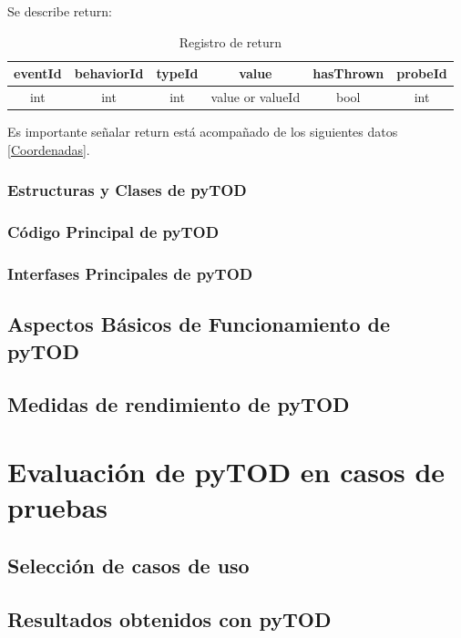 \documentclass[12pt,legalpaper]{report}
\begin{document}
Se describe return:\\

\begin{table}[!h]
\begin{center}
\begin{tabular}{| c | c | c | c | c | c |}
\hline
\rowcolor[gray]{0.9}eventId & behaviorId & typeId & value & hasThrown & probeId \\
\hline
int & int & int & value or valueId\footnotemark[1] & bool & int\\
\hline
\end{tabular}
\caption{Registro de return} 
\end{center}
\end{table}

Es importante señalar return está acompañado de los siguientes datos \ref{Coordenadas}.

		
		
		
		\subsection{Estructuras y Clases de pyTOD}
		\subsection{Código Principal de pyTOD}
		\subsection{Interfases Principales de pyTOD}
	\section{Aspectos Básicos de Funcionamiento de pyTOD}
	\section{Medidas de rendimiento de pyTOD}
\chapter{Evaluación de pyTOD en casos de pruebas}
	\section{Selección de casos de uso}
	\section{Resultados obtenidos con pyTOD}
\end{document}
